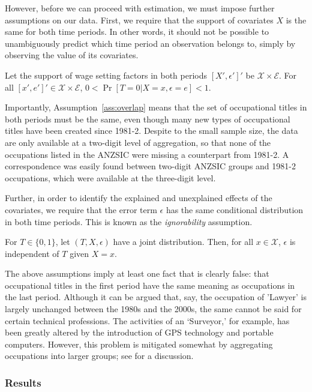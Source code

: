 However, before we can proceed with estimation, we must impose further assumptions on our data. First, we require that the support of covariates $X$ is the same for both time periods. In other words, it should not be possible to unambiguously predict which time period an observation belongs to, simply by observing the value of its covariates. 
\begin{assumption} \label{ass:overlap}
  Let the support of wage setting factors in both periods $[X',\epsilon']'$ be $\mathcal{X}\times\mathcal{E}$. For all $[x',e']' \in \mathcal{X}\times\mathcal{E}$,  $0 < \Pr[T=0 | X=x, \epsilon=e] < 1$.
\end{assumption}
Importantly, Assumption~\ref{ass:overlap} means that the set of occupational titles in both periods must be the same, even though many new types of occupational titles have been created since 1981-2. Despite to the small sample size, the data are only available at a two-digit level of aggregation, so that none of the occupations listed in the ANZSIC were missing a counterpart from 1981-2. A correspondence was easily found between two-digit ANZSIC groups and 1981-2 occupations, which were available at the three-digit level.

Further, in order to identify the explained and unexplained effects of the covariates, we require that the error term $\epsilon$ has the same conditional distribution in both time periods. This is known as the {\em ignorability} assumption.
\begin{assumption}[Ignorability]
  For $T\in\{0,1\}$, let $(T, X, \epsilon)$ have a joint distribution. Then, for all $x\in \mathcal{X}$, $\epsilon$ is independent of $T$ given $X=x$.
\end{assumption}

The above assumptions imply at least one fact that is clearly false: that occupational titles in the first period have the same meaning as occupations in the last period. Although it can be argued that, say, the occupation of 'Lawyer' is largely unchanged between the 1980s and the 2000s, the same cannot be said for certain technical professions. The activities of an `Surveyor,' for example, has been greatly altered by the introduction of GPS technology and portable computers. However, this problem is mitigated somewhat by aggregating occupations into larger groups; see \citet{Firpo2011} for a discussion.

\subsubsection{Results}

